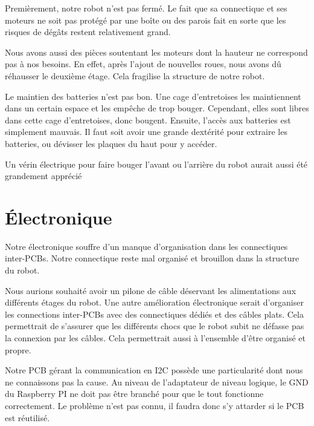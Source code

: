 \documentclass[
	a4paper,									%
	11pt,										%
	twoside,									%
	openright,									%
	notitlepage,									%
	parskip=half,								%
]{scrreprt}										%
\begin{document}
Premièrement, notre robot n'est pas fermé. Le fait que sa connectique et ses moteurs ne soit 
pas protégé par une boîte ou des parois fait en sorte que les risques de dégâts restent 
relativement grand. \par

Nous avons aussi des pièces soutentant les moteurs dont la hauteur ne correspond pas à nos besoins. 
En effet, après l'ajout de nouvelles roues, nous avons dû réhausser le deuxième étage. Cela fragilise 
la structure de notre robot. \par

Le maintien des batteries n'est pas bon. Une cage d'entretoises les maintiennent dans un certain espace
et les empêche de trop bouger. Cependant, elles sont libres dans cette cage d'entretoises, donc bougent. 
Ensuite, l'accès aux batteries est simplement mauvais. Il faut soit avoir une grande dextérité pour 
extraire les batteries, ou dévisser les plaques du haut pour y accéder. \par

Un vérin électrique pour faire bouger l'avant ou l'arrière du robot aurait aussi été grandement 
apprécié \par

\section{Électronique}

Notre électronique souffre d'un manque d'organisation dans les connectiques inter-PCBs.
Notre connectique reste mal organisé et brouillon dans la structure du robot. \par

Nous aurions souhaité avoir un pilone de câble déservant les alimentations aux 
différents étages du robot. Une autre amélioration électronique serait d'organiser les 
connections inter-PCBs avec des connectiques dédiés et des câbles plats. Cela permettrait 
de s'assurer que les différents chocs que le robot subit ne défasse pas la connexion 
par les câbles. Cela permettrait aussi à l'ensemble d'être organisé et propre. \par

Notre PCB gérant la communication en I2C possède une particularité dont nous ne connaissons pas 
la cause. Au niveau de l'adaptateur de niveau logique, le GND du Raspberry PI ne doit pas être branché 
pour que le tout fonctionne correctement. Le problème n'est pas connu, il faudra donc s'y attarder
si le PCB est réutilisé. \par
\end{document}
